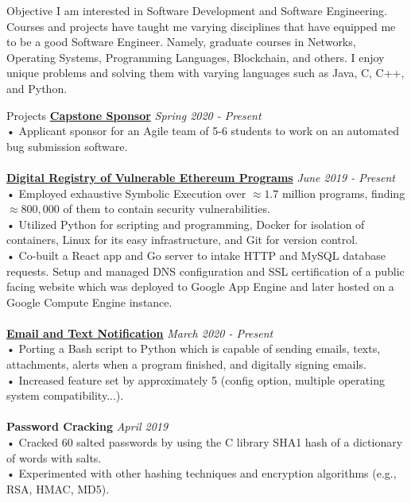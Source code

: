 \documentclass{resume} %
\begin{document}
\begin{rSection}{Objective}
  I am interested in Software Development and Software Engineering. Courses and projects have taught me varying disciplines that have equipped me to be a good Software Engineer. Namely, graduate courses in Networks, Operating Systems, Programming Languages, Blockchain, and others. I enjoy unique problems and solving them with varying languages such as Java, C, C++, and Python.
\end{rSection}
\begin{rSection}{Projects}
  {\bf \href{https://docs.google.com/presentation/d/11ACdzalpubDKvJFnA6a\_5ST7Dd3P\_EbLrq1DEpJKloM/edit#slide=id.p}{Capstone Sponsor}} \hfill {\em{Spring 2020 - Present}}
  \\• Applicant sponsor for an Agile team of 5-6 students to work on an automated bug submission software.\\
    \\{\bf \href{https://www.haveibeenexploited.com/}{Digital Registry of Vulnerable Ethereum Programs}} \hfill {\em{June 2019 - Present}}
  \\• Employed exhaustive Symbolic Execution over $\approx1.7$ million programs, finding $\approx800,000$ of them to contain security vulnerabilities.
  \\• Utilized Python for scripting and programming, Docker for isolation of containers, Linux for its easy infrastructure, and Git for version control.
  \\• Co-built a React app and Go server to intake HTTP and MySQL database requests. Setup and managed DNS configuration and SSL certification of a public facing website which was deployed to Google App Engine and later hosted on a Google Compute Engine instance.\\
  \\{\bf \href{https://github.com/tdulcet/Send-Msg-CLI/tree/python-port}{Email and Text Notification}} \hfill {\em{March 2020 - Present}}
  \\• Porting a Bash script to Python which is capable of sending emails, texts, attachments, alerts when a program finished, and digitally signing emails.
  \\• Increased feature set by approximately 5 (config option, multiple operating system compatibility...).\\
  \\{\bf Password Cracking} \hfill {\em{April 2019}}
  \\• Cracked 60 salted passwords by using the C library SHA1 hash of a dictionary of words with salts.
  \\• Experimented with other hashing techniques and encryption algorithms (e.g., RSA, HMAC, MD5).

\end{rSection}
\end{document}
